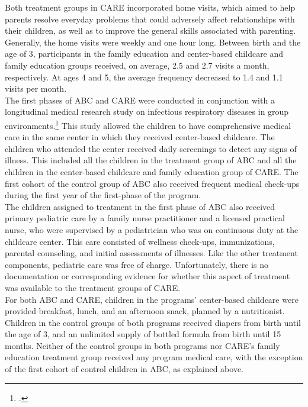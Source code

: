 \noindent Both treatment groups in CARE incorporated home visits, which aimed to help parents resolve everyday problems that could adversely affect relationships with their children, as well as to improve the general skills associated with parenting. Generally, the home visits were weekly and one hour long. Between birth and the age of 3, participants in the family education and center-based childcare and family education groups received, on average, 2.5 and 2.7 visits a month, respectively. At ages 4 and 5, the average frequency decreased to 1.4 and 1.1 visits per month.\\ 

\noindent The first phases of ABC and CARE were conducted in conjunction with a longitudinal medical research study on infectious respiratory diseases in group environments.\footnote{\citet{Henderson-et-al_1982_NEJoM}.} This study allowed the children to have comprehensive medical care in the same center in which they received center-based childcare. The children who attended the center received daily screenings to detect any signs of illness. This included all the children in the treatment group of ABC and all the children in the center-based childcare and family education group of CARE. The first cohort of the control group of ABC also received frequent medical check-ups during the first year of the first-phase of the program.\\

\noindent The children assigned to treatment in the first phase of ABC also received primary pediatric care by a family nurse practitioner and a licensed practical nurse, who were supervised by a pediatrician who was on continuous duty at the childcare center. This care consisted of wellness check-ups, immunizations, parental counseling, and initial assessments of illnesses. Like the other treatment components, pediatric care was free of charge. Unfortunately, there is no documentation or corresponding evidence for whether this aspect of treatment was available to the treatment groups of CARE.\\

\noindent For both ABC and CARE, children in the programs' center-based childcare were provided breakfast, lunch, and an afternoon snack, planned by a nutritionist. Children in the control groups of both programs received diapers from birth until the age of 3, and an unlimited supply of bottled formula from birth until 15 months. Neither of the control groups in both programs nor CARE's family education treatment group received any program medical care, with the exception of the first cohort of control children in ABC, as explained above.\\

